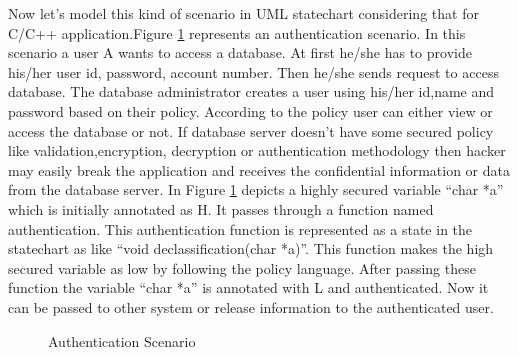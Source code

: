 Now let's model this kind of scenario in UML statechart considering that for C/C++ application.Figure \ref{authentication_scenario}  represents an authentication scenario. In this scenario a user A wants to access a database. At first he/she has to provide his/her user id, password, account number. Then he/she sends request to access database. The database administrator creates a user using his/her id,name and password based on their policy. According to the policy user can either view or access the database or not. If database server doesn't have some secured policy like validation,encryption, decryption or authentication methodology then hacker may easily break the application and receives the confidential information or data from the database server. In Figure \ref{authentication_scenario} depicts a highly secured variable \enquote{char *a} which is initially annotated as H. It passes through a function named authentication. This authentication function is represented as a state in the statechart as like \enquote{void declassification(char *a)}. This function makes the high secured variable as low by following the policy language. After passing these function the variable \enquote{char *a} is annotated with L and authenticated. Now it can be passed to other system or release information to the authenticated user.

\begin{figure}[htbp]
	\centering
	\label{authentication_scenario}
	\caption{Authentication Scenario}
\end{figure}

